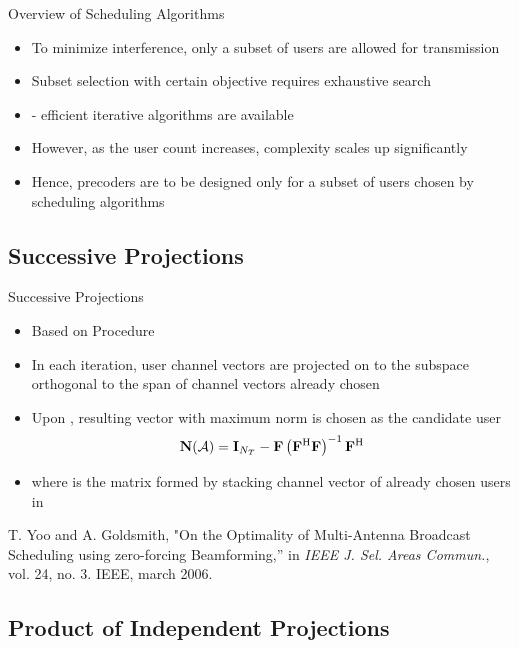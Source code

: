 \documentclass[11pt]{beamer}
\begin{document}
\begin{frame}{Overview of Scheduling Algorithms}
\begin{itemize}
	\item To minimize interference, only a subset of users are allowed for transmission
	\item Subset selection with certain objective requires exhaustive search
	\item {} - efficient iterative algorithms are available
	\item However, as the user count increases, complexity scales up significantly
	\item Hence, precoders are to be designed only for a subset of users chosen by scheduling algorithms
\end{itemize}
\end{frame}

\subsection{Successive Projections}

\begin{frame}{Successive Projections\eqn{^\dagger}}
\begin{itemize}
\item Based on  Procedure
\item In each iteration, user channel vectors are projected on to the subspace orthogonal to the span of channel vectors already chosen
\item Upon , resulting vector with maximum norm is chosen as the candidate user
\[\mathbf{N}(\mathcal{A}) = \mathbf{I}_{N_T} - \mathbf{F} \left (\mathbf{F}^{\mathrm{H}} \mathbf{F} \right )^{-1} \mathbf{F}^{\mathrm{H}}\]
\item where  is the matrix formed by stacking channel vector of already chosen users in 
\end{itemize}
\eqn{^\dagger}\scriptsize{T. Yoo and A. Goldsmith, "{On the Optimality of Multi-Antenna Broadcast Scheduling using zero-forcing Beamforming},” in \emph{IEEE J. Sel. Areas Commun.}, vol. 24, no. 3. IEEE, march 2006.}
\end{frame}

\subsection{Product of Independent Projections}
\end{document}

